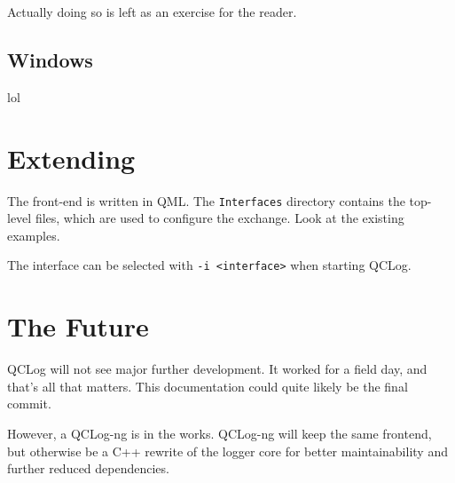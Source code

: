 \documentclass[a4paper,10pt]{article}
\begin{document}
Actually doing so is left as an exercise for the reader.

\subsection{Windows}
lol

\section{Extending}
The front-end is written in QML. The \texttt{Interfaces} directory contains the top-level
files, which are used to configure the exchange. Look at the existing examples.

The interface can be selected with \texttt{-i <interface>} when starting QCLog.

\section{The Future}
QCLog will not see major further development. It worked for a field day, and that's all
that matters. This documentation could quite likely be the final commit.

However, a QCLog-ng is in the works. QCLog-ng will keep the same frontend, but
otherwise be a C++ rewrite of the logger core for better maintainability and
further reduced dependencies.
\end{document}
